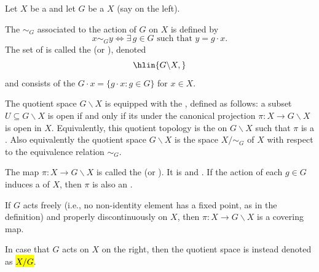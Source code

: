 \begin{definition} \label{definition:quotient_of_a_topological_space_under_group_action}
    Let $X$ be a  and let $G$ be a   $X$ (say on the left).

    The  $\sim_G$ associated to the action of $G$ on $X$ is defined by
    $$x \sim_G y \iff \exists\, g \in G \text{ such that } y = g \cdot x.$$
    The set of  is called the  (or ), denoted
    $$\hlin{G \backslash X,}$$
    and consists of the  $G \cdot x = \{g \cdot x : g \in G\}$ for $x \in X$. 

    The quotient space $G \backslash X$ is equipped with the , defined as follows: a subset $U \subseteq G \backslash X$ is open if and only if its  under the canonical projection $\pi : X \to G \backslash X$ is open in $X$. Equivalently, this quotient topology is the  on $G \backslash X$ such that $\pi$ is a . Also equivalently the quotient space $G \backslash X$ is the  space $X / \sim_G$ of $X$ with respect to the equivalence relation $\sim_G$.

    The map $\pi : X \to G \backslash X$ is called the  (or ). It is  and . If the action of each $g \in G$ induces a  of $X$, then $\pi$ is also an .

    If $G$ acts freely (i.e., no non-identity element has a fixed point, as in the  definition) and properly discontinuously on $X$, then $\pi : X \to G \backslash X$ is a covering map.

    In case that $G$ acts on $X$ on the right, then the quotient space is instead denoted as \hl{$X / G$}.

\end{definition}